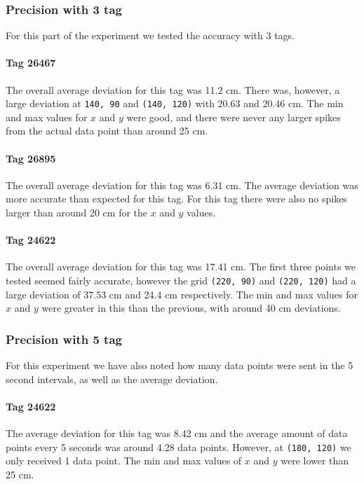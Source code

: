 \subsubsection{Precision with 3 tag}
For this part of the experiment we tested the accuracy with 3 tags. 

\paragraph{Tag 26467}
The overall average deviation for this tag was 11.2 cm.
There was, however, a large deviation at \texttt{140, 90} and \texttt{(140, 120)} with 20.63 and 20.46 cm.
The min and max values for $x$ and $y$ were good, and there were never any larger spikes from the actual data point than around 25 cm.

\paragraph{Tag 26895}
The overall average deviation for this tag was 6.31 cm.
The average deviation was more accurate than expected for this tag.
For this tag there were also no spikes larger than around 20 cm for the $x$ and $y$ values.

\paragraph{Tag 24622}
The overall average deviation for this tag was 17.41 cm.
The first three points we tested seemed fairly accurate, however the grid \texttt{(220, 90)} and \texttt{(220, 120)} had a large deviation of 37.53 cm and 24.4 cm respectively.
The min and max values for $x$ and $y$ were greater in this than the previous, with around 40 cm deviations.

\subsubsection{Precision with 5 tag}
For this experiment we have also noted how many data points were sent in the 5 second intervals, as well as the average deviation.

\paragraph{Tag 24622}
The average deviation for this tag was 8.42 cm and the average amount of data points every 5 seconds was around 4.28 data points.
However, at \texttt{(180, 120)} we only received 1 data point.
The min and max values of $x$ and $y$ were lower than 25 cm.

